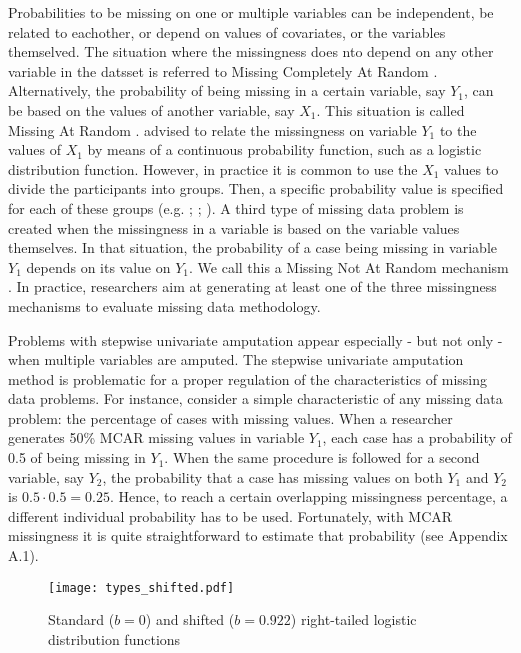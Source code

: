 \documentclass[11pt,a4paper]{article}
\begin{document}
Probabilities to be missing on one or multiple variables can be independent, be related to eachother, or depend on values of covariates, or the variables themselved. The situation where the missingness does nto depend on any other variable in the datsset is referred to Missing Completely At Random \citep[i.e. MCAR,][]{Rubin1976}. Alternatively, the probability of being missing in a certain variable, say $Y_1$, can be based on the values of another variable, say $X_1$. This situation is called Missing At Random \citep[i.e. MAR,][]{Rubin1976}. \citet[][pp. 63, 64]{Stef2012} advised to relate the missingness on variable $Y_1$ to the values of $X_1$ by means of a continuous probability function, such as a logistic distribution function. However, in practice it is common to use the $X_1$ values to divide the participants into groups. Then, a specific probability value is specified for each of these groups (e.g. \citealp{Kontopantelis2017}; \citealp{Allison2000}; \citealp{Yuan2012}). A third type of missing data problem is created when the missingness in a variable is based on the variable values themselves. In that situation, the probability of a case being missing in variable $Y_1$ depends on its value on $Y_1$. We call this a Missing Not At Random mechanism \citep[i.e. MNAR,][pp. 31, 32]{Rubin1987, Stef2012}. In practice, researchers aim at generating at least one of the three missingness mechanisms to evaluate missing data methodology.

Problems with stepwise univariate amputation appear especially - but not only - when multiple variables are amputed. The stepwise univariate amputation method is problematic for a proper regulation of the characteristics of missing data problems. For instance, consider a simple characteristic of any missing data problem: the percentage of cases with missing values. When a researcher generates 50\% MCAR missing values in variable $Y_1$, each case has a probability of 0.5 of being missing in $Y_1$. When the same procedure is followed for a second variable, say $Y_2$, the probability that a case has missing values on both $Y_1$ and $Y_2$ is $0.5 \cdot 0.5 = 0.25$. Hence, to reach a certain overlapping missingness percentage, a different individual probability has to be used. Fortunately, with MCAR missingness it is quite straightforward to estimate that probability (see Appendix A.1).

\begin{figure}[t!]
\centering
\texttt{[image: types\_shifted.pdf]}
\caption{\small Standard ($b = 0$) and shifted ($b = 0.922$) right-tailed logistic distribution functions}
\label{types_shifted}
\end{figure}
\end{document}
